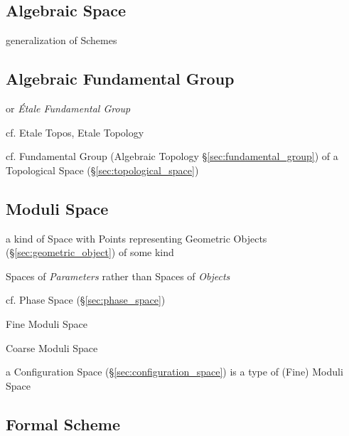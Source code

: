 \subsection{Algebraic Space}\label{sec:algebraic_space}

generalization of Schemes



\subsection{Algebraic Fundamental Group}\label{sec:algebraic_fundamental_group}

or \emph{\'Etale Fundamental Group}

cf. Etale Topos, Etale Topology

cf. Fundamental Group (Algebraic Topology \S\ref{sec:fundamental_group}) of a
Topological Space (\S\ref{sec:topological_space})



\subsection{Moduli Space}\label{sec:moduli_space}

a kind of Space with Points representing Geometric Objects
(\S\ref{sec:geometric_object}) of some kind

Spaces of \emph{Parameters} rather than Spaces of \emph{Objects}

cf. Phase Space (\S\ref{sec:phase_space})

Fine Moduli Space

Coarse Moduli Space

a Configuration Space (\S\ref{sec:configuration_space}) is a type of (Fine)
Moduli Space



\subsection{Formal Scheme}\label{sec:formal_scheme}

